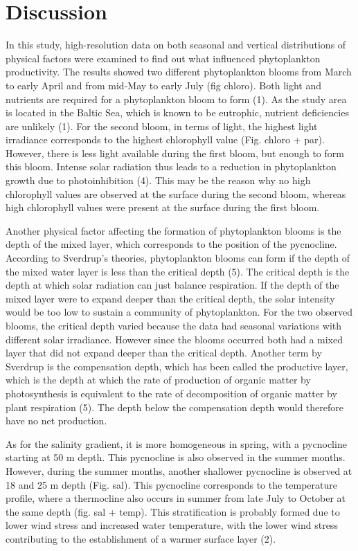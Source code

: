\documentclass[../Main.tex]{subfiles}
\begin{document}
\section{Discussion}
In this study, high-resolution data on both seasonal and vertical distributions of physical factors were examined to find out what influenced phytoplankton productivity. The results showed two different phytoplankton blooms from March to early April and from mid-May to early July (fig chloro). Both light and nutrients are required for a phytoplankton bloom to form (1). As the study area is located in the Baltic Sea, which is known to be eutrophic, nutrient deficiencies are unlikely (1). For the second bloom, in terms of light, the highest light irradiance corresponds to the highest chlorophyll value (Fig. chloro + par). However, there is less light available during the first bloom, but enough to form this bloom. Intense solar radiation thus leads to a reduction in phytoplankton growth due to photoinhibition (4). This may be the reason why no high chlorophyll values are observed at the surface during the second bloom, whereas high chlorophyll values were present at the surface during the first bloom.  

Another physical factor affecting the formation of phytoplankton blooms is the depth of the mixed layer, which corresponds to the position of the pycnocline. According to Sverdrup's theories, phytoplankton blooms can form if the depth of the mixed water layer is less than the critical depth (5). The critical depth is the depth at which solar radiation can just balance respiration. If the depth of the mixed layer were to expand deeper than the critical depth, the solar intensity would be too low to sustain a community of phytoplankton. For the two observed blooms, the critical depth varied because the data had seasonal variations with different solar irradiance. However since the blooms occurred both had a mixed layer that did not expand deeper than the critical depth. Another term by Sverdrup is the compensation depth, which has been called the productive layer, which is the depth at which the rate of production of organic matter by photosynthesis is equivalent to the rate of decomposition of organic matter by plant respiration (5). The depth below the compensation depth would therefore have no net production. 

As for the salinity gradient, it is more homogeneous in spring, with a pycnocline starting at 50 m depth. This pycnocline is also observed in the summer months. However, during the summer months, another shallower pycnocline is observed at 18 and 25 m depth (Fig. sal). This pycnocline corresponds to the temperature profile, where a thermocline also occurs in summer from late July to October at the same depth (fig. sal + temp). This stratification is probably formed due to lower wind stress and increased water temperature, with the lower wind stress contributing to the establishment of a warmer surface layer (2).
\end{document}
